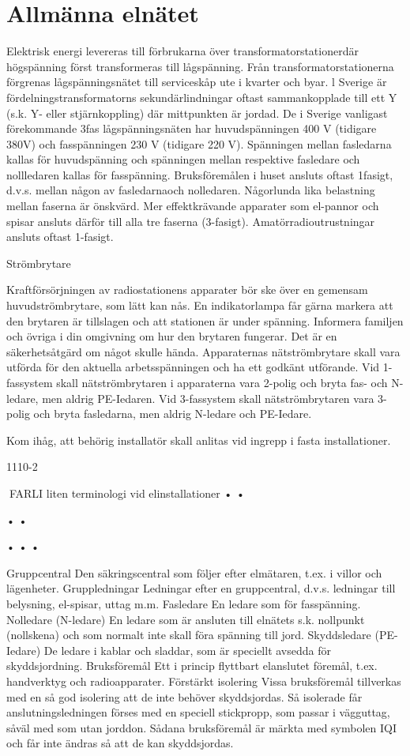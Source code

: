 \section{Allmänna elnätet}

Elektrisk energi levereras till förbrukarna över
transformatorstationerdär högspänning först
transformeras till lågspänning. Från transformatorstationerna förgrenas lågspänningsnätet till serviceskåp ute i kvarter och byar.
l Sverige är fördelningstransformatorns
sekundärlindningar oftast sammankopplade
till ett Y (s.k. Y- eller stjärnkoppling) där
mittpunkten är jordad.
De i Sverige vanligast förekommande 3fas lågspänningsnäten har huvudspänningen
400 V (tidigare 380V) och fasspänningen
230 V (tidigare 220 V). Spänningen mellan
fasledarna kallas för huvudspänning och
spänningen mellan respektive fasledare och
nollledaren kallas för fasspänning.
Bruksföremålen i huset ansluts oftast 1fasigt, d.v.s. mellan någon av fasledarnaoch
nolledaren. Någorlunda lika belastning mellan faserna är önskvärd. Mer effektkrävande
apparater som el-pannor och spisar ansluts
därför till alla tre faserna (3-fasigt). Amatörradioutrustningar ansluts oftast 1-fasigt.

Strömbrytare

Kraftförsörjningen av radiostationens apparater bör ske över en gemensam huvudströmbrytare, som lätt kan nås. En indikatorlampa får gärna markera att den brytaren är
tillslagen och att stationen är under spänning.
Informera familjen och övriga i din omgivning om hur den brytaren fungerar. Det är en
säkerhetsåtgärd om något skulle hända.
Apparaternas nätströmbrytare skall vara
utförda för den aktuella arbetsspänningen
och ha ett godkänt utförande.
Vid 1-fassystem skall nätströmbrytaren i
apparaterna vara 2-polig och bryta fas- och
N-ledare, men aldrig PE-Iedaren.
Vid 3-fassystem skall nätströmbrytaren
vara 3-polig och bryta fasledarna, men aldrig
N-ledare och PE-Iedare.

Kom ihåg, att behörig installatör skall
anlitas vid ingrepp i fasta installationer.

1110-2

FARLI
liten terminologi vid elinstallationer
•
•

•
•

•
•
•

Gruppcentral
Den säkringscentral som följer efter elmätaren, t.ex. i villor och lägenheter.
Gruppledningar
Ledningar efter en gruppcentral, d.v.s.
ledningar till belysning, el-spisar, uttag
m.m.
Fasledare
En ledare som för fasspänning.
Nolledare (N-ledare)
En ledare som är ansluten till elnätets s.k.
nollpunkt (nollskena) och som normalt
inte skall föra spänning till jord.
Skyddsledare (PE-Iedare)
De ledare i kablar och sladdar, som är
speciellt avsedda för skyddsjordning.
Bruksföremål
Ett i princip flyttbart elanslutet föremål,
t.ex. handverktyg och radioapparater.
Förstärkt isolering
Vissa bruksföremål tillverkas med en så
god isolering att de inte behöver skyddsjordas. Så isolerade får anslutningsledningen förses med en speciell stickpropp,
som passar i vägguttag, såväl med som
utan jorddon. Sådana bruksföremål är
märkta med symbolen IQI och får inte
ändras så att de kan skyddsjordas.

